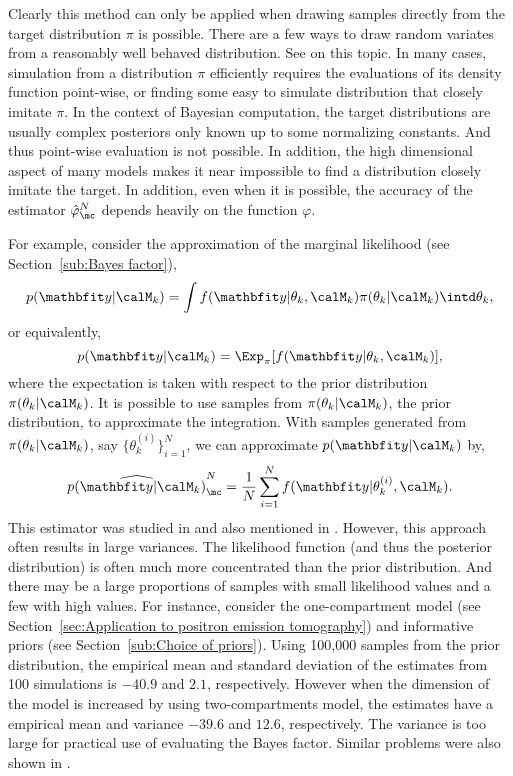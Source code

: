 Clearly this method can only be applied when drawing samples directly from the
target distribution $\pi$ is possible. There are a few ways to draw random
variates from a reasonably well behaved distribution. See
\cite[][chap.~2]{Robert:2004tn} on this topic. In many cases, simulation from
a distribution $\pi$ efficiently requires the evaluations of its density
function point-wise, or finding some easy to simulate distribution that
closely imitate $\pi$. In the context of Bayesian computation, the target
distributions are usually complex posteriors only known up to some normalizing
constants. And thus point-wise evaluation is not possible. In addition, the
high dimensional aspect of many models makes it near impossible to find a
distribution closely imitate the target. In addition, even when it is
possible, the accuracy of the estimator $\hat\varphi_{\mc}^N$ depends heavily
on the function $\varphi$.

For example, consider the approximation of the marginal likelihood (see
Section~\ref{sub:Bayes factor}),
\begin{equation*}
  p(\data|\calM_k) =
  \int f(\data|\theta_k,\calM_k)\pi(\theta_k|\calM_k) \intd \theta_k,
\end{equation*}
or equivalently,
\begin{equation}
  p(\data|\calM_k) = \Exp_{\pi}[f(\data|\theta_k,\calM_k)],
  \label{eq:prior expectation}
\end{equation}
where the expectation is taken with respect to the prior distribution
$\pi(\theta_k|\calM_k)$. It is possible to use samples from
$\pi(\theta_k|\calM_k)$, the prior distribution, to approximate the
integration. With samples generated from $\pi(\theta_k|\calM_k)$, say
$\{\theta_k^{(i)}\}_{i=1}^N$, we can approximate $p(\data|\calM_k)$ by,
\begin{equation}
  \widehat{p(\data|\calM_k)}_{\mc}^N
  = \frac{1}{N}\sum_{i=1}^N f(\data|\theta_k^{(i)},\calM_k).
\end{equation}
This estimator was studied in \cite{McCulloch:1991vx} and also mentioned in
\cite{Kass:1995vb}. However, this approach often results in large variances.
The likelihood function (and thus the posterior distribution) is often much
more concentrated than the prior distribution. And there may be a large
proportions of samples with small likelihood values and a few with high
values. For instance, consider the one-compartment \pet model (see
Section~\ref{sec:Application to positron emission tomography}) and
informative priors (see Section~\ref{sub:Choice of priors}). Using 100,000
samples from the prior distribution, the empirical mean and standard deviation
of the estimates from 100 simulations is $-40.9$ and $2.1$, respectively.
However when the dimension of the model is increased by using two-compartments
model, the estimates have a empirical mean and variance $-39.6$ and $12.6$,
respectively. The variance is too large for practical use of evaluating the
Bayes factor. Similar problems were also shown in \cite{McCulloch:1991vx}.


